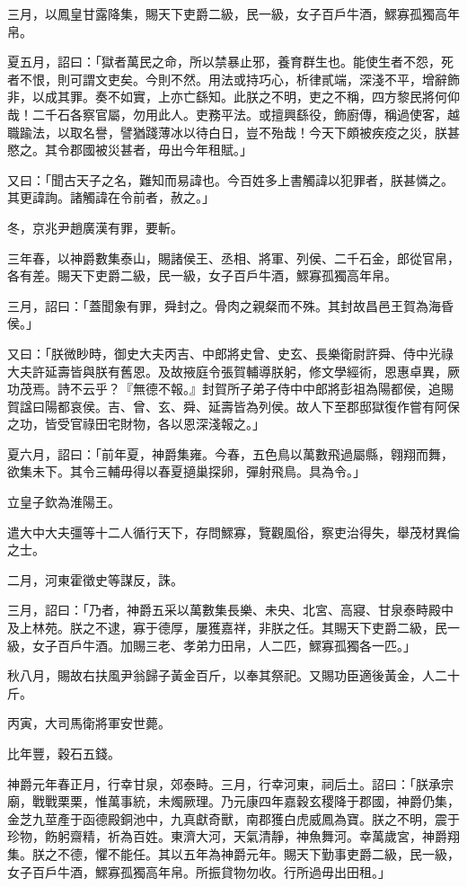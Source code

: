 \begin{pinyinscope}
三月，以鳳皇甘露降集，賜天下吏爵二級，民一級，女子百戶牛酒，鰥寡孤獨高年帛。

夏五月，詔曰：「獄者萬民之命，所以禁暴止邪，養育群生也。能使生者不怨，死者不恨，則可謂文吏矣。今則不然。用法或持巧心，析律貳端，深淺不平，增辭飾非，以成其罪。奏不如實，上亦亡繇知。此朕之不明，吏之不稱，四方黎民將何仰哉！二千石各察官屬，勿用此人。吏務平法。或擅興繇役，飾廚傳，稱過使客，越職踰法，以取名譽，譬猶踐薄冰以待白日，豈不殆哉！今天下頗被疾疫之災，朕甚愍之。其令郡國被災甚者，毋出今年租賦。」

又曰：「聞古天子之名，難知而易諱也。今百姓多上書觸諱以犯罪者，朕甚憐之。其更諱詢。諸觸諱在令前者，赦之。」

冬，京兆尹趙廣漢有罪，要斬。

三年春，以神爵數集泰山，賜諸侯王、丞相、將軍、列侯、二千石金，郎從官帛，各有差。賜天下吏爵二級，民一級，女子百戶牛酒，鰥寡孤獨高年帛。

三月，詔曰：「蓋聞象有罪，舜封之。骨肉之親粲而不殊。其封故昌邑王賀為海昏侯。」

又曰：「朕微眇時，御史大夫丙吉、中郎將史曾、史玄、長樂衛尉許舜、侍中光祿大夫許延壽皆與朕有舊恩。及故掖庭令張賀輔導朕躬，修文學經術，恩惠卓異，厥功茂焉。詩不云乎？『無德不報。』封賀所子弟子侍中中郎將彭祖為陽都侯，追賜賀諡曰陽都哀侯。吉、曾、玄、舜、延壽皆為列侯。故人下至郡邸獄復作嘗有阿保之功，皆受官祿田宅財物，各以恩深淺報之。」

夏六月，詔曰：「前年夏，神爵集雍。今春，五色鳥以萬數飛過屬縣，翱翔而舞，欲集未下。其令三輔毋得以春夏擿巢探卵，彈射飛鳥。具為令。」

立皇子欽為淮陽王。

遣大中大夫彊等十二人循行天下，存問鰥寡，覽觀風俗，察吏治得失，舉茂材異倫之士。

二月，河東霍徵史等謀反，誅。

三月，詔曰：「乃者，神爵五采以萬數集長樂、未央、北宮、高寢、甘泉泰畤殿中及上林苑。朕之不逮，寡于德厚，屢獲嘉祥，非朕之任。其賜天下吏爵二級，民一級，女子百戶牛酒。加賜三老、孝弟力田帛，人二匹，鰥寡孤獨各一匹。」

秋八月，賜故右扶風尹翁歸子黃金百斤，以奉其祭祀。又賜功臣適後黃金，人二十斤。

丙寅，大司馬衛將軍安世薨。

比年豐，穀石五錢。

神爵元年春正月，行幸甘泉，郊泰畤。三月，行幸河東，祠后土。詔曰：「朕承宗廟，戰戰栗栗，惟萬事統，未燭厥理。乃元康四年嘉穀玄稷降于郡國，神爵仍集，金芝九莖產于函德殿銅池中，九真獻奇獸，南郡獲白虎威鳳為寶。朕之不明，震于珍物，飭躬齋精，祈為百姓。東濟大河，天氣清靜，神魚舞河。幸萬歲宮，神爵翔集。朕之不德，懼不能任。其以五年為神爵元年。賜天下勤事吏爵二級，民一級，女子百戶牛酒，鰥寡孤獨高年帛。所振貸物勿收。行所過毋出田租。」


\end{pinyinscope}
